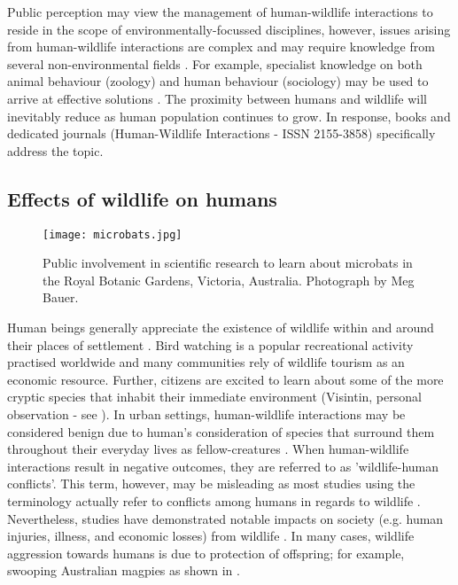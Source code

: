 Public perception may view the management of human-wildlife interactions to reside in the scope of environmentally-focussed disciplines, however, issues arising from human-wildlife interactions are complex and may require knowledge from several non-environmental fields \citep{deck97,madd04}. For example, specialist knowledge on both animal behaviour (zoology) and human behaviour (sociology) may be used to arrive at effective solutions \citep{dicka10}. The proximity between humans and wildlife will inevitably reduce as human population continues to grow. In response, books \cite{manf08} and dedicated journals (Human-Wildlife Interactions - ISSN 2155-3858) specifically address the topic.

\subsection{Effects of wildlife on humans}

\begin{figure*}[htp]
  \centering
  \texttt{[image: microbats.jpg]}
  \caption[Public involvement with wildlife]{Public involvement in scientific research to learn about microbats in the Royal Botanic Gardens, Victoria, Australia. Photograph by Meg Bauer.}
  \label{microbats}
\end{figure*}

Human beings generally appreciate the existence of wildlife within and around their places of settlement \citep{dick86,kell93,news05,raad07}. Bird watching is a popular recreational activity practised worldwide and many communities rely of wildlife tourism as an economic resource. Further, citizens are excited to learn about some of the more cryptic species that inhabit their immediate environment (Visintin, personal observation - see ). In urban settings, human-wildlife interactions may be considered benign due to human's consideration of species that surround them throughout their everyday lives as fellow-creatures \citep{zinn08}. When human-wildlife interactions result in negative outcomes, they are referred to as 'wildlife-human conflicts'. This term, however, may be misleading as most studies using the terminology actually refer to conflicts among humans in regards to wildlife \citep{pete10}. Nevertheless, studies have demonstrated notable impacts on society (e.g. human injuries, illness, and economic losses) from wildlife \citep{cono95}. In many cases, wildlife aggression towards humans is due to protection of offspring; for example, swooping Australian magpies \citep{jone99} as shown in .


